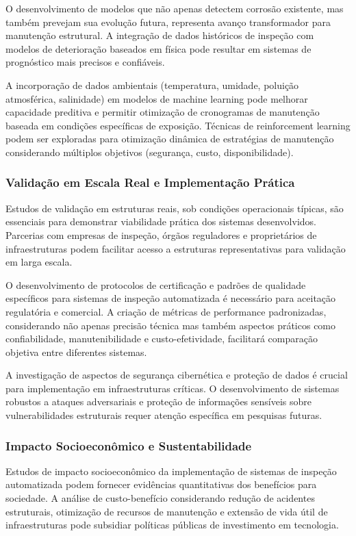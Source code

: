 \documentclass[12pt,a4paper,twoside]{article}
\begin{document}
O desenvolvimento de modelos que não apenas detectem corrosão existente, mas também prevejam sua evolução futura, representa avanço transformador para manutenção estrutural. A integração de dados históricos de inspeção com modelos de deterioração baseados em física pode resultar em sistemas de prognóstico mais precisos e confiáveis.

A incorporação de dados ambientais (temperatura, umidade, poluição atmosférica, salinidade) em modelos de machine learning pode melhorar capacidade preditiva e permitir otimização de cronogramas de manutenção baseada em condições específicas de exposição. Técnicas de reinforcement learning podem ser exploradas para otimização dinâmica de estratégias de manutenção considerando múltiplos objetivos (segurança, custo, disponibilidade).

\subsubsection{Validação em Escala Real e Implementação Prática}

Estudos de validação em estruturas reais, sob condições operacionais típicas, são essenciais para demonstrar viabilidade prática dos sistemas desenvolvidos. Parcerias com empresas de inspeção, órgãos reguladores e proprietários de infraestruturas podem facilitar acesso a estruturas representativas para validação em larga escala.

O desenvolvimento de protocolos de certificação e padrões de qualidade específicos para sistemas de inspeção automatizada é necessário para aceitação regulatória e comercial. A criação de métricas de performance padronizadas, considerando não apenas precisão técnica mas também aspectos práticos como confiabilidade, manutenibilidade e custo-efetividade, facilitará comparação objetiva entre diferentes sistemas.

A investigação de aspectos de segurança cibernética e proteção de dados é crucial para implementação em infraestruturas críticas. O desenvolvimento de sistemas robustos a ataques adversariais e proteção de informações sensíveis sobre vulnerabilidades estruturais requer atenção específica em pesquisas futuras.

\subsubsection{Impacto Socioeconômico e Sustentabilidade}

Estudos de impacto socioeconômico da implementação de sistemas de inspeção automatizada podem fornecer evidências quantitativas dos benefícios para sociedade. A análise de custo-benefício considerando redução de acidentes estruturais, otimização de recursos de manutenção e extensão de vida útil de infraestruturas pode subsidiar políticas públicas de investimento em tecnologia.
\end{document}
